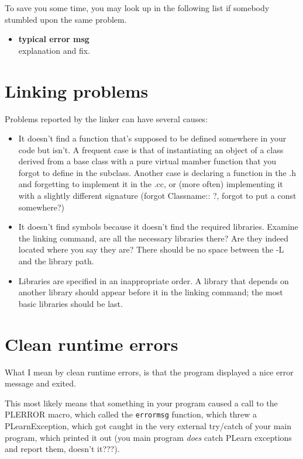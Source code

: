 \documentclass[11pt]{book}
\begin{document}
To save you some time, you may look up in the following list if
somebody stumbled upon the same problem.

\begin{itemize}

\item {\bf typical error msg } \\ 
explanation and fix.

\end{itemize}



\section{Linking problems}

Problems reported by the linker can have several causes:

\begin{itemize}
\item It doesn't find a function that's supposed to be defined somewhere in
  your code but isn't.  A frequent case is that of instantiating an object
  of a class derived from a base class with a pure virtual mamber function
  that you forgot to define in the subclass. Another case is declaring a
  function in the .h and forgetting to implement it in the .cc, or (more
  often) implementing it with a slightly different signature (forgot
  Classname:: ?, forgot to put a const somewhere?)
\item It doesn't find symbols because it doesn't find the required
  libraries. Examine the linking command, are all the necessary libraries there? Are they
  indeed located where you say they are? There should be no space between the
  -L and the library path.
\item Libraries are specified in an inappropriate order. A library that
  depends on another library should appear before it in the linking
  command; the most basic libraries should be last.
\end{itemize}



\section{Clean runtime errors}

What I mean by clean runtime errors, is that the program displayed a nice
error message and exited.

This most likely means that something in your program caused a call to the
PLERROR macro, which called the {\tt errormsg} function, which threw a
PLearnException, which got caught in the very external try/catch of your
main program, which printed it out (you main program {\em does} catch
PLearn exceptions and report them, doesn't it???).
\end{document}
